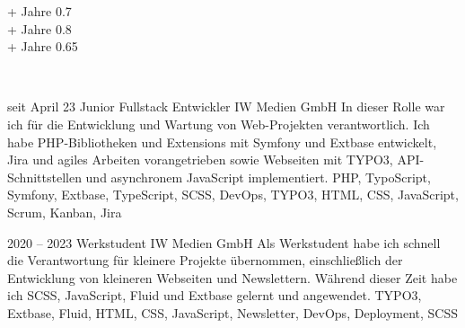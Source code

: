 \begin{paracol}{2}
\begin{leftcolumn}
 {\number\numexpr{}\relax+ Jahre} {0.7} \\[-2pt]

 {\number\numexpr{}\relax+ Jahre} {0.8} \\[-2pt]

 {\number\numexpr{}\relax+ Jahre} {0.65} \\[-2pt]

\end{leftcolumn}

\begin{rightcolumn}

 \\[14pt]
\vspace{-12pt}


\cveventAccent
	{seit April 23}
	{Junior Fullstack Entwickler}
	{IW Medien GmbH}
	{
		In dieser Rolle war ich für die Entwicklung und Wartung von Web-Projekten verantwortlich. Ich habe PHP-Bibliotheken und Extensions mit Symfony und Extbase entwickelt, Jira und agiles Arbeiten vorangetrieben sowie Webseiten mit TYPO3, API-Schnittstellen und asynchronem JavaScript implementiert.
	}
	{PHP, TypoScript, Symfony, Extbase, TypeScript, SCSS, DevOps, TYPO3, HTML, CSS, JavaScript, Scrum, Kanban, Jira}
\vfill\null

\vspace{6pt}

\cvevent
	{2020 – 2023}
	{Werkstudent}
	{IW Medien GmbH}
	{
		Als Werkstudent habe ich schnell die Verantwortung für kleinere Projekte übernommen, einschließlich der Entwicklung von kleineren Webseiten und Newslettern. Während dieser Zeit habe ich SCSS, JavaScript, Fluid und Extbase gelernt und angewendet.
	}
	{TYPO3, Extbase, Fluid, HTML, CSS, JavaScript, Newsletter, DevOps, Deployment, SCSS}
\vfill\null


\end{rightcolumn}
\end{paracol}
